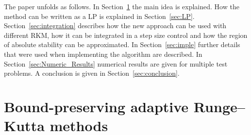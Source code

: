 \documentclass[a4paper]{article}
\numberwithin{equation}{section}
\theoremstyle{plain}
\theoremstyle{definition}
\numberwithin{theorem}{section}
\newcommand{\1}{\mathbbm{1}}
\begin{document}
The paper unfolds as follows. In Section~\ref{sec:main_idea} the main idea is explained. How the method can be written as a LP is explained in Section~\ref{sec:LP}.
Section~\ref{sec:integration} describes how the new approach can be used with different RKM, how it can be integrated in a step size control and how the region of absolute stability can be approximated.
In Section~\ref{sec:imple} further details that were used when implementing the algorithm are described.
In Section~\ref{sec:Numeric_Results} numerical results are given for multiple test problems.
A conclusion is given in Section~\ref{sec:conclusion}.



\section{Bound-preserving adaptive Runge--Kutta methods}\label{sec:main_idea}
\end{document}
